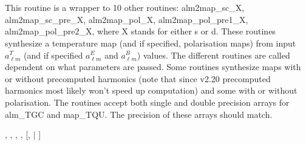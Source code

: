 
\sloppy


\section[alm2map*]{ }
\label{sub:alm2map}
\author{Eric Hivon, Frode K.~Hansen}

\begin{facility}
{This routine is a wrapper to 10 other routines: alm2map\_sc\_X,
  alm2map\_sc\_pre\_X, alm2map\_pol\_X, alm2map\_pol\_pre1\_X,
  alm2map\_pol\_pre2\_X, where X stands for either s or d. These routines
  synthesize a  temperature map (and if specified, polarisation maps) 
from input $a_{\ell m}^T$ (and if specified $a_{\ell m}^E$ and $a_{\ell m}^B$) values. 
The different routines are called dependent on what parameters are passed. 
Some routines synthesize maps with or without precomputed harmonics (note that
since \healpix v2.20 precomputed harmonics most likely won't speed up computation)
and some with or without polarisation.
The routines accept both single and double precision arrays for alm\_TGC and
  map\_TQU. The precision of these arrays should match.}
{\modAlmTools}
\end{facility}

\begin{f90format}
{%
, %
, %
, %
, %
 [, %
$|$ ]}
\end{f90format}

